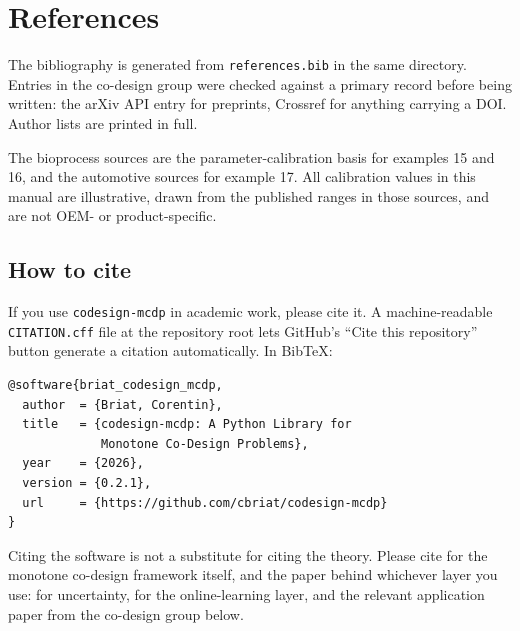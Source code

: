 \documentclass[11pt,a4paper]{article}
\newcommand{\codename}{\texttt{codesign-mcdp}}
\begin{document}
\section*{References}

The bibliography is generated from \texttt{references.bib} in the same
directory. Entries in the co-design group were checked against a primary
record before being written: the arXiv API entry for preprints, Crossref
for anything carrying a DOI. Author lists are printed in full.

The bioprocess sources are the parameter-calibration basis for examples 15
and 16, and the automotive sources for example 17. All calibration values
in this manual are illustrative, drawn from the published ranges in those
sources, and are not OEM- or product-specific.

\subsection*{How to cite}

If you use \codename{} in academic work, please cite it. A
machine-readable \texttt{CITATION.cff} file at the repository root lets
GitHub's ``Cite this repository'' button generate a citation
automatically. In BibTeX:

\begin{verbatim}
@software{briat_codesign_mcdp,
  author  = {Briat, Corentin},
  title   = {codesign-mcdp: A Python Library for
             Monotone Co-Design Problems},
  year    = {2026},
  version = {0.2.1},
  url     = {https://github.com/cbriat/codesign-mcdp}
}
\end{verbatim}

\noindent Citing the software is not a substitute for citing the theory.
Please cite \citet{censi2015mathematical} for the monotone co-design
framework itself, and the paper behind whichever layer you use:
\citet{censi2017uncertainty} for uncertainty,
\citet{alharbi2026online} for the online-learning layer, and the relevant
application paper from the co-design group below.

\nocite{censi2026act4e}



\end{document}
